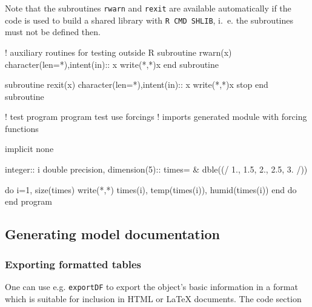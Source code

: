 \documentclass[times,onecolumn]{article}
\begin{document}
\medskip
Note that the subroutines \verb|rwarn| and \verb|rexit| are available automatically if the code is used to build a shared library with \verb|R CMD SHLIB|, i.~e. the subroutines must not be defined then.

\begin{shaded}
\begin{Schunk}
\begin{Soutput}
 ! auxiliary routines for testing outside R 
 subroutine rwarn(x) 
   character(len=*),intent(in):: x 
   write(*,*)x 
 end subroutine 
  
 subroutine rexit(x) 
   character(len=*),intent(in):: x 
   write(*,*)x 
   stop 
 end subroutine 
  
 ! test program 
 program test 
 use forcings  ! imports generated module with forcing functions 
  
 implicit none 
  
 integer:: i 
 double precision, dimension(5):: times= & 
   dble((/ 1., 1.5, 2., 2.5, 3. /)) 
  
 do i=1, size(times) 
   write(*,*) times(i), temp(times(i)), humid(times(i)) 
 end do 
 end program 
\end{Soutput}
\end{Schunk}
\end{shaded}


\subsection{Generating model documentation} \label{sec:advanced:doc}

\subsubsection{Exporting formatted tables} \label{sec:advanced:doc:tables}

One can use e.g. \verb|exportDF| to export the object's basic information in a format which is suitable for inclusion in HTML or \LaTeX{} documents. The code section

\begin{Schunk}
\end{Schunk}
\end{document}
